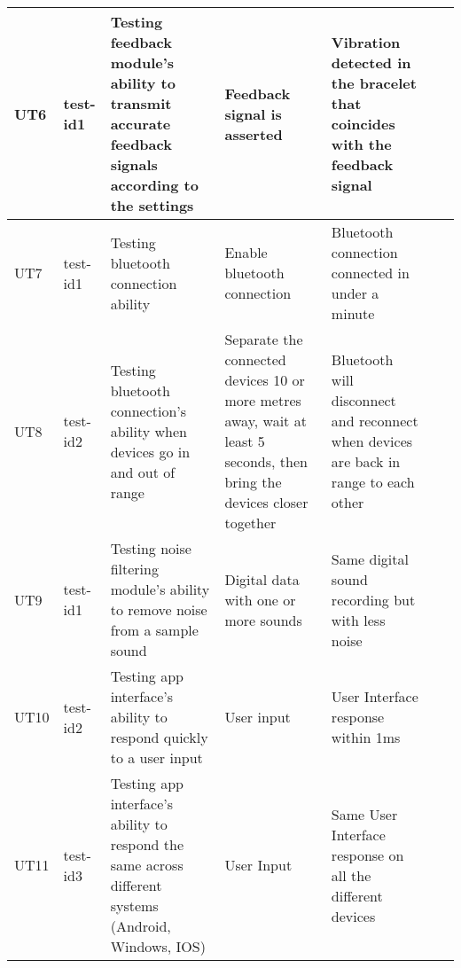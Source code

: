 \documentclass[12pt, titlepage]{article}
\begin{document}
\begin{longtable}{|p{1.1cm}|p{1cm}|p{3cm}|p{1.5cm}|p{2.5cm}|p{2cm}|p{1.2cm}|}
  UT6       & test-id1          & Testing feedback module's ability to transmit accurate feedback signals according to the settings  & Feedback signal is asserted              & Vibration detected in the bracelet that coincides with the feedback signal                          &                        &                                                    \\ \hline
  UT7       & test-id1          & Testing bluetooth connection ability                                     & Enable bluetooth connection                                  & Bluetooth connection connected in under a minute                    &                        &                                                    \\ \hline
  UT8       & test-id2          & Testing bluetooth connection's ability when devices go in and out of range                                      & Separate the connected devices 10 or more metres away, wait at least 5 seconds, then bring the devices closer together                                  & Bluetooth will disconnect and reconnect when devices are back in range to each other                    &                        &                                                    \\ \hline
  UT9       & test-id1          & Testing noise filtering module's ability to remove noise from a sample sound                                      & Digital data with one or more sounds                                  & Same digital sound recording but with less noise                    &                        &                                                    \\ \hline
  UT10       & test-id2          & Testing app interface's ability to respond quickly to a user input                                      & User input                                  & User Interface response within 1ms                    &                        &                                                    \\ \hline
  UT11       & test-id3          & Testing app interface's ability to respond the same across different systems (Android, Windows, IOS)                                      & User Input                                  & Same User Interface response on all the different devices                    &                        &                                                    \\ \hline
\end{longtable}
\end{document}
